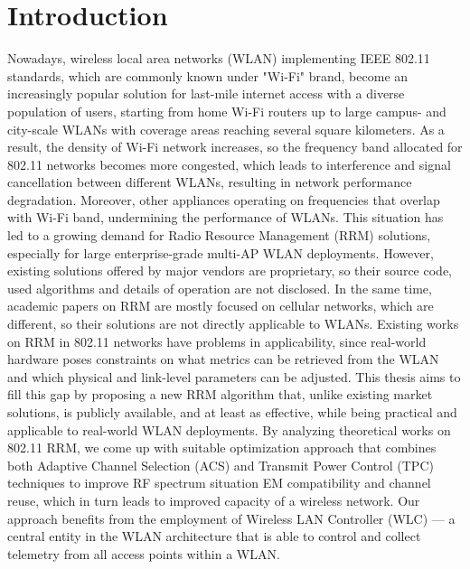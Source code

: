 \chapter{Introduction}
\label{chap:intro}

Nowadays, wireless local area networks (WLAN) implementing IEEE 802.11 standards, which are commonly known under "Wi-Fi" brand, become an increasingly popular solution for last-mile internet access with a diverse population of users, starting from home Wi-Fi routers up to large campus- and city-scale WLANs with coverage areas reaching several square kilometers.
As a result, the density of Wi-Fi network increases, so the frequency band allocated for 802.11 networks becomes more congested, which leads to interference and signal cancellation between different WLANs, resulting in network performance degradation.
Moreover, other appliances operating on frequencies that overlap with Wi-Fi band, undermining the performance of WLANs.
This situation has led to a growing demand for Radio Resource Management (RRM) solutions, especially for large enterprise-grade multi-AP WLAN deployments.
However, existing solutions offered by major vendors are proprietary, so their source code, used algorithms and details of operation are not disclosed.
In the same time, academic papers on RRM are mostly focused on cellular networks, which are different, so their solutions are not directly applicable to WLANs. Existing works on RRM in 802.11 networks have problems in applicability, since real-world hardware poses constraints on what metrics can be retrieved from the WLAN and which physical and link-level parameters can be adjusted.
This thesis aims to fill this gap by proposing a new RRM algorithm that, unlike existing market solutions, is publicly available, and at least as effective, while being practical and applicable to real-world WLAN deployments.
By analyzing theoretical works on 802.11 RRM, we come up with suitable optimization approach that combines both Adaptive Channel Selection (ACS) and Transmit Power Control (TPC) techniques to improve RF spectrum situation EM compatibility and channel reuse, which in turn leads to improved capacity of a wireless network.
Our approach benefits from the employment of Wireless LAN Controller (WLC) — a central entity in the WLAN architecture that is able to control and collect telemetry from all access points within a WLAN.

